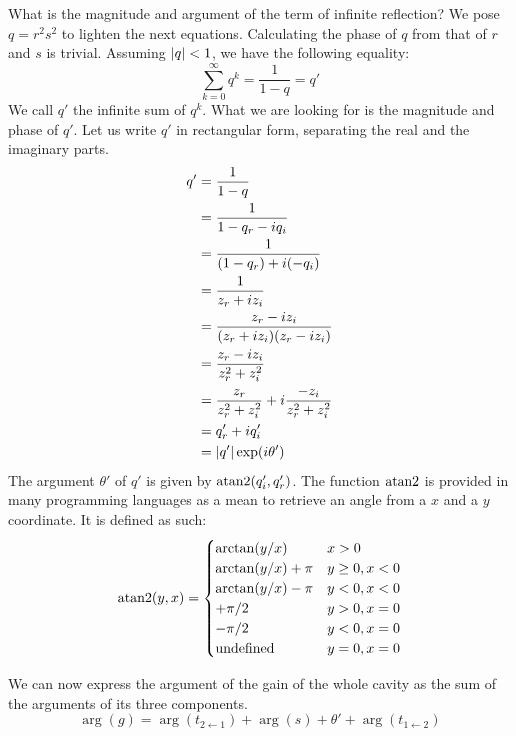 What is the magnitude and argument of the term of infinite reflection?
We pose $q = r^2s^2$ to lighten the next equations.
Calculating the phase of $q$ from that of $r$ and $s$ is trivial.
Assuming $\left| q \right| < 1$, we have the following equality:
\begin{equation}
    \sum_{k=0}^\infty q^k = \frac{1}{1 - q} = q'
\end{equation}
We call $q'$ the infinite sum of $q^k$.
What we are looking for is the magnitude and phase of $q'$.
Let us write $q'$ in rectangular form, separating the real and the imaginary parts.
\begin{align}
    q'
    &=
    \frac{1}{1 - q}
    \\
    &=
    \frac{1}{1 - q_r - i q_i}
    \\
    &=
    \frac{1}{(1 - q_r) + i (-q_i)}
    \\
    &=
    \frac{1}{z_r + i z_i}
    \\
    &=
    \frac{z_r - i z_i}{(z_r + i z_i)(z_r - i z_i)}
    \\
    &=
    \frac{z_r - i z_i}{z_r^2 + z_i^2}
    \\
    &=
    \frac{z_r}{z_r^2 + z_i^2}
    + i
    \frac{-z_i}{z_r^2 + z_i^2}
    \\
    &=
    q'_r + i q'_i
    \\
    &=
    \left| q' \right| \exp(i\theta')
\end{align}
The argument $\theta'$ of $q'$ is given by $\textrm{atan2}(q'_i, q'_r)$.
The function $\textrm{atan2}$ is provided in many programming languages as a mean to retrieve an angle from a $x$ and a $y$ coordinate.
It is defined as such:
\begin{equation}
    \textrm{atan2}(y, x) =
    \begin{cases}
        \arctan (y / x)       & x > 0 \\
        \arctan (y / x) + \pi & y \ge 0, x < 0 \\
        \arctan (y / x) - \pi & y < 0, x < 0 \\
        +\pi/2                & y > 0, x = 0 \\
        -\pi/2                & y < 0, x = 0 \\
        \textrm{undefined}    & y = 0, x = 0
    \end{cases}
\end{equation}

We can now express the argument of the gain of the whole cavity as the sum of the arguments of its three components.
\begin{equation}
    \arg(g) = \arg(t_{2 \leftarrow 1}) + \arg(s) + \theta' + \arg(t_{1 \leftarrow 2})
\end{equation}

